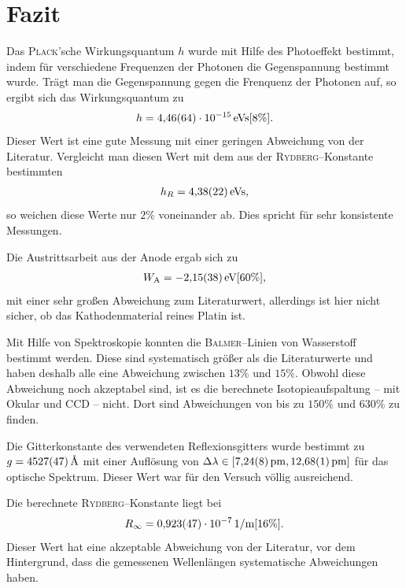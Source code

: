 \documentclass[sn-mathphys-num,iicol]{sn-jnl}
\theoremstyle{thmstyleone}
\theoremstyle{thmstyletwo}
\theoremstyle{thmstylethree}
\begin{document}
\section{Fazit}
Das \textsc{Plack}'sche Wirkungsquantum $h$ wurde mit Hilfe des Photoeffekt bestimmt, indem für verschiedene Frequenzen der Photonen die Gegenspannung bestimmt wurde.
Trägt man die Gegenspannung gegen die Frenquenz der Photonen auf, so ergibt sich das Wirkungsquantum zu
\begin{align} 
        h=\SI{4.46+-0.64e-15}{eVs}[8\%]
.\end{align} 
Dieser Wert ist eine gute Messung mit einer geringen Abweichung von der Literatur.
Vergleicht man diesen Wert mit dem aus der \textsc{Rydberg}--Konstante bestimmten
\begin{align} 
        h_R=\SI{4.38+-0.22}{eVs}
,\end{align} 
so weichen diese Werte nur $2\%$ voneinander ab.
Dies spricht für sehr konsistente Messungen.

Die Austrittsarbeit aus der Anode ergab sich zu
\begin{align} 
        W_\text{A}=\SI{-2.15+-0.38}{eV}[60\%]
,\end{align} 
mit einer sehr großen Abweichung zum Literaturwert, allerdings ist hier nicht sicher, ob das Kathodenmaterial reines Platin ist.

Mit Hilfe von Spektroskopie konnten die \textsc{Balmer}--Linien von Wasserstoff bestimmt werden.
Diese sind systematisch größer als die Literaturwerte und haben deshalb alle eine Abweichung zwischen $13\%$ und $15\%$.
Obwohl diese Abweichung noch akzeptabel sind, ist es die berechnete Isotopieaufspaltung -- mit Okular und CCD -- nicht.
Dort sind Abweichungen von bis zu $150\%$ und $630\%$ zu finden.

Die Gitterkonstante des verwendeten Reflexionsgitters wurde bestimmt zu $g=\SI{4527+-47}{\text{\r{A}}}$ mit einer Auflösung von $\Delta \lambda  \in \left[\SI{7.24+-0.08}{pm},\SI{12.68+-0.01}{pm}\right]$ für das optische Spektrum.
Dieser Wert war für den Versuch völlig ausreichend.

Die berechnete \textsc{Rydberg}--Konstante liegt bei
\begin{align} 
        R_\infty=\SI{0.923+-0.047e-7}{1/m}[16\%]
.\end{align} 
Dieser Wert hat eine akzeptable Abweichung von der Literatur, vor dem Hintergrund, dass die gemessenen Wellenlängen systematische Abweichungen haben.

\clearpage
\end{document}
